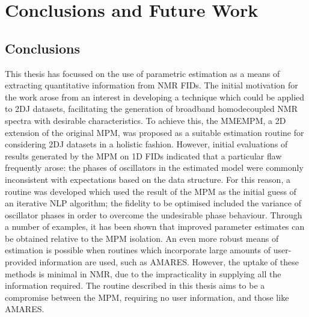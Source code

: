 \chapter{Conclusions and Future Work}
\label{chap:conclusions}

\section{Conclusions}
This thesis has focussed on the use of parametric estimation as a means of
extracting quantitative information from \ac{NMR} \acp{FID}. The initial
motivation for the work arose from an interest in developing a technique
which could be applied to \ac{2DJ} datasets, facilitating the generation of broadband
homodecoupled \ac{NMR} spectra with desirable characteristics.
To achieve this, the \ac{MMEMPM}, a \ac{2D} extension of the original \ac{MPM},
was proposed as a suitable estimation routine for considering \ac{2DJ} datasets
in a holistic fashion.
However, initial evaluations of results generated by the \ac{MPM} on
\ac{1D} \acp{FID} indicated that a particular flaw frequently arose: the phases
of oscillators in the estimated model were commonly inconsistent with
expectations based on the data structure.
For this reason, a routine was developed which used the result of the
\ac{MPM} as the initial guess of an iterative \ac{NLP} algorithm; the fidelity
to be optimised included the variance of oscillator phases in order to overcome
the undesirable phase behaviour.
Through a number of examples, it has been shown that improved parameter
estimates can be obtained relative to the \ac{MPM} isolation.
An even more robust means of estimation is possible when routines which
incorporate large amounts of user-provided information are used, such as
\ac{AMARES}. However, the uptake of these methods is minimal in \ac{NMR}, due to
the impracticality in supplying all the information required. The routine
described in this thesis aims to be a compromise between the \ac{MPM},
requiring no user information, and those like \ac{AMARES}.

